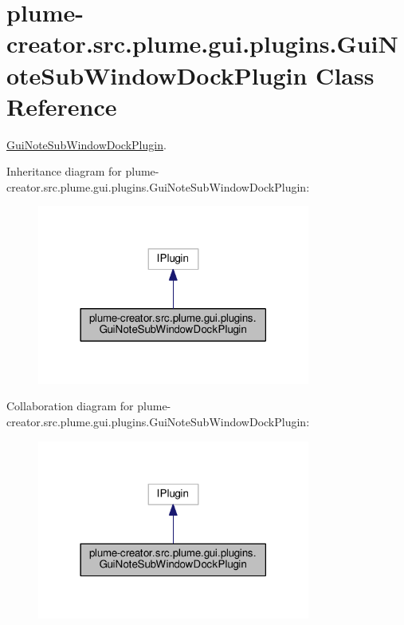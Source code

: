 \hypertarget{classplume-creator_1_1src_1_1plume_1_1gui_1_1plugins_1_1_gui_note_sub_window_dock_plugin}{}\section{plume-\/creator.src.\+plume.\+gui.\+plugins.\+Gui\+Note\+Sub\+Window\+Dock\+Plugin Class Reference}
\label{classplume-creator_1_1src_1_1plume_1_1gui_1_1plugins_1_1_gui_note_sub_window_dock_plugin}


\hyperlink{classplume-creator_1_1src_1_1plume_1_1gui_1_1plugins_1_1_gui_note_sub_window_dock_plugin}{Gui\+Note\+Sub\+Window\+Dock\+Plugin}.  




Inheritance diagram for plume-\/creator.src.\+plume.\+gui.\+plugins.\+Gui\+Note\+Sub\+Window\+Dock\+Plugin\+:\nopagebreak
\begin{figure}[H]
\begin{center}
\leavevmode
\includegraphics[width=254pt]{classplume-creator_1_1src_1_1plume_1_1gui_1_1plugins_1_1_gui_note_sub_window_dock_plugin__inherit__graph}
\end{center}
\end{figure}


Collaboration diagram for plume-\/creator.src.\+plume.\+gui.\+plugins.\+Gui\+Note\+Sub\+Window\+Dock\+Plugin\+:\nopagebreak
\begin{figure}[H]
\begin{center}
\leavevmode
\includegraphics[width=254pt]{classplume-creator_1_1src_1_1plume_1_1gui_1_1plugins_1_1_gui_note_sub_window_dock_plugin__coll__graph}
\end{center}
\end{figure}
